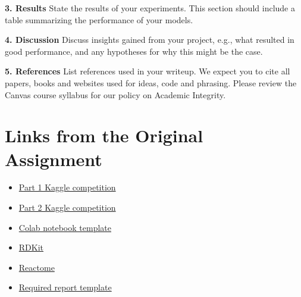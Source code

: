 \documentclass[11pt,letterpaper]{article}
\begin{document}
\textbf{3. Results} State the results of your experiments. This section should include a table summarizing the performance of your models.

\textbf{4. Discussion} Discuss insights gained from your project, e.g., what resulted in good performance, and any hypotheses for why this might be the case.

\textbf{5. References} List references used in your writeup. We expect you to cite all papers, books and websites used for ideas, code and phrasing. Please review the Canvas course syllabus for our policy on Academic Integrity.

\section*{Links from the Original Assignment}
\begin{itemize}
\item \href{https://www.kaggle.com/t/48065448beca40168ae71374ca8d8885}{Part 1 Kaggle competition}
\item \href{https://www.kaggle.com/t/1c4a9f921d3c4ca585dab6d2c5d0bfc8}{Part 2 Kaggle competition}
\item \href{https://colab.research.google.com/drive/1mECHFXxHQnHAQiq5T3VPxeAjHXwFK7TG?usp=sharing}{Colab notebook template}
\item \href{https://www.rdkit.org}{RDKit}
\item \href{https://reactome.org}{Reactome}
\item \href{https://www.overleaf.com/latex/templates/cvpr-2018-template/qgmrfntfbqns}{Required report template}
\end{itemize}
\end{document}
